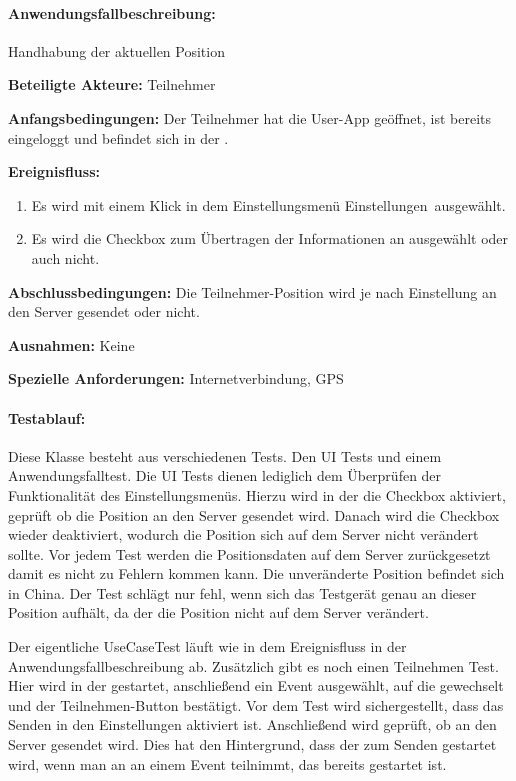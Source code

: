 \paragraph{Anwendungsfallbeschreibung:} Handhabung der aktuellen Position

\textbf{Beteiligte Akteure:}
	Teilnehmer
	
\textbf{Anfangsbedingungen:}
	Der Teilnehmer hat die User-App geöffnet, ist bereits eingeloggt und befindet sich in der .
	
\textbf{Ereignisfluss:}
	\begin{enumerate}
		\item Es wird mit einem Klick in dem Einstellungsmenü \glqq Einstellungen\grqq\ ausgewählt.
		\item Es wird die Checkbox zum Übertragen der Informationen an ausgewählt oder auch nicht.
	\end{enumerate}
	
\textbf{Abschlussbedingungen:}
	Die Teilnehmer-Position wird je nach Einstellung an den Server gesendet oder nicht.
	
\textbf{Ausnahmen:}
	Keine
	
\textbf{Spezielle Anforderungen:}
	Internetverbindung, GPS

\paragraph{Testablauf:}
Diese Klasse besteht aus verschiedenen Tests. Den UI Tests und einem Anwendungsfalltest. Die UI Tests dienen lediglich dem Überprüfen der Funktionalität des Einstellungsmenüs. Hierzu wird in der  die Checkbox aktiviert, geprüft ob die Position an den Server gesendet wird. Danach wird die Checkbox wieder deaktiviert, wodurch die Position sich auf dem Server nicht verändert sollte. Vor jedem Test werden die Positionsdaten auf dem Server zurückgesetzt damit es nicht zu Fehlern kommen kann. Die unveränderte Position befindet sich in China. Der Test schlägt nur fehl, wenn sich das Testgerät genau an dieser Position aufhält, da der  die Position nicht auf dem Server verändert.

Der eigentliche UseCaseTest läuft wie in dem Ereignisfluss in der Anwendungsfallbeschreibung ab. Zusätzlich gibt es noch einen Teilnehmen  Test. Hier wird in der  gestartet, anschließend ein Event ausgewählt, auf die  gewechselt und der Teilnehmen-Button bestätigt. Vor dem Test wird sichergestellt, dass das Senden in den Einstellungen aktiviert ist. Anschließend wird geprüft, ob an den Server gesendet wird. Dies hat den Hintergrund, dass der  zum Senden gestartet wird, wenn man an an einem Event teilnimmt, das bereits gestartet ist.


